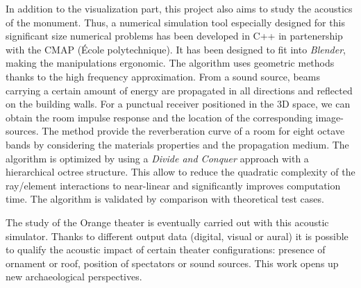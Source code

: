 In addition to the visualization part, this project also aims to study the acoustics of the monument. Thus, a numerical simulation tool especially designed for this significant size numerical problems has been developed in C++ in partenership with the CMAP (École polytechnique). It has been designed to fit into \textit{Blender}, making the manipulations ergonomic. The algorithm uses geometric methods thanks to the high frequency approximation. From a sound source, beams carrying a certain amount of energy are propagated in all directions and reflected on the building walls. For a punctual receiver positioned in the 3D space, we can obtain the room impulse response and the location of the corresponding image-sources. The method provide the reverberation curve of a room for eight octave bands by considering the materials properties and the propagation medium. The algorithm is optimized by using a \textit{Divide and Conquer} approach with a hierarchical octree structure. This allow to reduce the quadratic complexity of the ray/element interactions to near-linear and significantly improves computation time. The algorithm is validated by comparison with theoretical test cases.
 
The study of the Orange theater is eventually carried out with this acoustic simulator. Thanks to different output data (digital, visual or aural) it is possible to qualify the acoustic impact of certain theater configurations: presence of ornament or roof, position of spectators or sound sources. This work opens up new archaeological perspectives.


